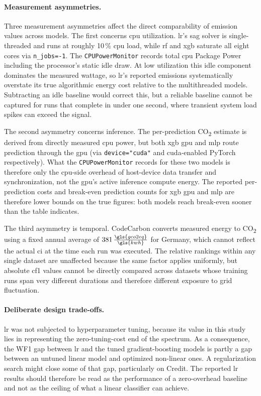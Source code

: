 \paragraph{Measurement asymmetries.}
Three measurement asymmetries affect the direct comparability of emission values across models. The first concerns \gls{cpu} utilization. \gls{lr}'s \gls{sag} solver is single-threaded and runs at roughly 10\,\% \gls{cpu} load, while \gls{rf} and \gls{xgb} saturate all eight cores via \texttt{n\_jobs=-1}. The \texttt{CPUPowerMonitor} records total \gls{cpu} Package Power including the processor's static idle draw. At low utilization this idle component dominates the measured wattage, so \gls{lr}'s reported emissions systematically overstate its true algorithmic energy cost relative to the multithreaded models. Subtracting an idle baseline would correct this, but a reliable baseline cannot be captured for runs that complete in under one second, where transient system load spikes can exceed the signal.

The second asymmetry concerns inference. The per-prediction CO\textsubscript{2} estimate is derived from directly measured \gls{cpu} power, but both \gls{xgb} \gls{gpu} and \gls{mlp} route prediction through the \gls{gpu} (via \texttt{device="cuda"} and \gls{cuda}-enabled PyTorch respectively). What the \texttt{CPUPowerMonitor} records for these two models is therefore only the \gls{cpu}-side overhead of host-device data transfer and synchronization, not the \gls{gpu}'s active inference compute energy. The reported per-prediction costs and break-even prediction counts for \gls{xgb} \gls{gpu} and \gls{mlp} are therefore lower bounds on the true figures: both models reach break-even sooner than the table indicates.

The third asymmetry is temporal. CodeCarbon converts measured energy to CO\textsubscript{2} using a fixed annual average of $381\,\frac{\gls{gco2eq}}{\gls{kwh}}$ for Germany, which cannot reflect the actual \gls{ci} at the time each run was executed. The relative rankings within any single dataset are unaffected because the same factor applies uniformly, but absolute \gls{cf1} values cannot be directly compared across datasets whose training runs span very different durations and therefore different exposure to grid fluctuation.

\paragraph{Deliberate design trade-offs.}
\gls{lr} was not subjected to hyperparameter tuning, because its value in this study lies in representing the zero-tuning-cost end of the spectrum. As a consequence, the WF1 gap between \gls{lr} and the tuned gradient-boosting models is partly a gap between an untuned linear model and optimized non-linear ones. A regularization search might close some of that gap, particularly on Credit. The reported \gls{lr} results should therefore be read as the performance of a zero-overhead baseline and not as the ceiling of what a linear classifier can achieve.

